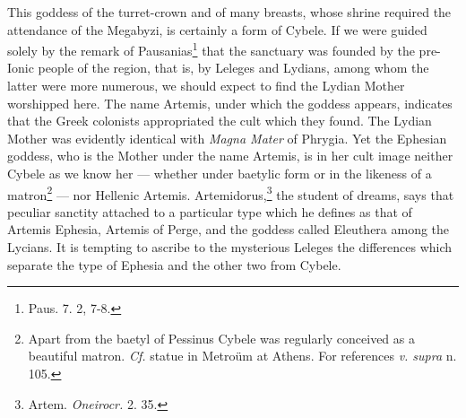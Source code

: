 \documentclass[a4paper, 12pt, oneside]{article}
\begin{document}
This goddess of the turret-crown and of many breasts, whose shrine required the attendance of the Megabyzi, is certainly a form of Cybele. If we were guided solely by the remark of Pausanias\footnote{Paus. 7. 2, 7-8.} that the sanctuary was founded by the pre-Ionic people of the region, that is, by Leleges and Lydians, among whom the latter were more numerous, we should expect to find the Lydian Mother worshipped here. The name Artemis, under which the goddess appears, indicates that the Greek colonists appropriated the cult which they found. The Lydian Mother was evidently identical with \emph{Magna Mater} of Phrygia. Yet the Ephesian goddess, who is the Mother under the name Artemis, is in her cult image neither Cybele as we know her --- whether under baetylic form or in the likeness of a matron\footnote{Apart from the baetyl of Pessinus Cybele was regularly conceived as a beautiful matron. \emph{Cf.} statue in Metroüm at Athens. For references \emph{v. supra} n. 105.} --- nor Hellenic Artemis. Artemidorus,\footnote{Artem. \emph{Oneirocr.} 2. 35.} the student of dreams, says that peculiar sanctity attached to a particular type which he defines as that of Artemis Ephesia, Artemis of Perge, and the goddess called Eleuthera among the Lycians. It is tempting to ascribe to the mysterious Leleges the differences which separate the type of Ephesia and the other two from Cybele.
\end{document}
